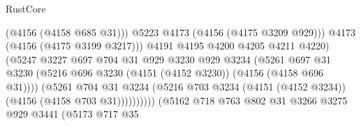 \begin{lexlean}{RustCore}
\begin{coremodule}
                                                  (@4156 (@4158 @685 @31)))
                                                @5223
                                                @4173
                                                (@4156 (@4175 @3209 @929)))
                                              @4173
                                              (@4156 (@4175 @3199 @3217)))
                                            @4191
                                            @4195
                                            @4200
                                            @4205
                                            @4211
                                            @4220)
                                          (@5247
                                            @3227
                                            @697
                                            @704
                                            @31
                                            @929
                                            @3230
                                            @929
                                            @3234
                                            (@5261
                                              @697
                                              @31
                                              @3230
                                              (@5216
                                                @696
                                                @3230
                                                (@4151 (@4152 @3230))
                                                (@4156 (@4158 @696 @31))))
                                            (@5261
                                              @704
                                              @31
                                              @3234
                                              (@5216
                                                @703
                                                @3234
                                                (@4151 (@4152 @3234))
                                                (@4156 (@4158 @703 @31))))))))))
                                (@5162
                                  @718
                                  @763
                                  @802
                                  @31
                                  @3266
                                  @3275
                                  @929
                                  @3441
                                  (@5173
                                    @717
                                    @35

\end{coremodule}
\end{lexlean}
